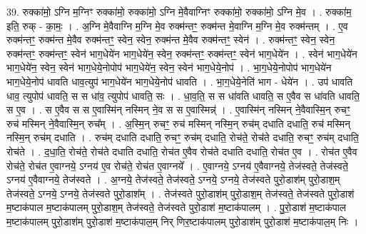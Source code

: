 \documentclass[17pt]{extarticle}
\begin{document}
39. रुक्का॑मो॒ ऽग्नि म॒ग्निꣳ रुक्का॑मो॒ रुक्का॑मो॒ ऽग्नि मे॒वैवाग्निꣳ रुक्का॑मो॒ रुक्का॑मो॒ ऽग्नि मे॒व । . रुक्का॑म॒ इति॒ रुक् - का॒मः॒ । . अ॒ग्नि मे॒वैवाग्नि म॒ग्नि मे॒व रुक्म॑न्तꣳ॒॒ रुक्म॑न्त मे॒वाग्नि म॒ग्नि मे॒व रुक्म॑न्तम् । . ए॒व रुक्म॑न्तꣳ॒॒ रुक्म॑न्त मे॒वैव रुक्म॑न्तꣳ॒॒ स्वेन॒ स्वेन॒ रुक्म॑न्त मे॒वैव रुक्म॑न्तꣳ॒॒ स्वेन॑ । . रुक्म॑न्तꣳ॒॒ स्वेन॒ स्वेन॒ रुक्म॑न्तꣳ॒॒ रुक्म॑न्तꣳ॒॒ स्वेन॑ भाग॒धेये॑न भाग॒धेये॑न॒ स्वेन॒ रुक्म॑न्तꣳ॒॒ रुक्म॑न्तꣳ॒॒ स्वेन॑ भाग॒धेये॑न । . स्वेन॑ भाग॒धेये॑न भाग॒धेये॑न॒ स्वेन॒ स्वेन॑ भाग॒धेये॒नोपोप॑ भाग॒धेये॑न॒ स्वेन॒ स्वेन॑ भाग॒धेये॒नोप॑ । . भा॒ग॒धेये॒नोपोप॑ भाग॒धेये॑न भाग॒धेये॒नोप॑ धावति धाव॒त्युप॑ भाग॒धेये॑न भाग॒धेये॒नोप॑ धावति । . भा॒ग॒धेये॒नेति॑ भाग - धेये॑न । . उप॑ धावति धाव॒ त्युपोप॑ धावति॒ स स धा॑व॒ त्युपोप॑ धावति॒ सः । . धा॒व॒ति॒ स स धा॑वति धावति॒ स ए॒वैव स धा॑वति धावति॒ स ए॒व । . स ए॒वैव स स ए॒वास्मि॑न् नस्मिन् ने॒व स स ए॒वास्मिन्न्॑ । . ए॒वास्मि॑न् नस्मिन् ने॒वैवास्मि॒न् रुचꣳ॒॒ रुच॑ मस्मिन् ने॒वैवास्मि॒न् रुच᳚म् । . अ॒स्मि॒न् रुचꣳ॒॒ रुच॑ मस्मिन् नस्मि॒न् रुच॑म् दधाति दधाति॒ रुच॑ मस्मिन् नस्मि॒न् रुच॑म् दधाति । . रुच॑म् दधाति दधाति॒ रुचꣳ॒॒ रुच॑म् दधाति॒ रोच॑ते॒ रोच॑ते दधाति॒ रुचꣳ॒॒ रुच॑म् दधाति॒ रोच॑ते । . द॒धा॒ति॒ रोच॑ते॒ रोच॑ते दधाति दधाति॒ रोच॑त ए॒वैव रोच॑ते दधाति दधाति॒ रोच॑त ए॒व । . रोच॑त ए॒वैव रोच॑ते॒ रोच॑त ए॒वाग्नये॒ ऽग्नय॑ ए॒व रोच॑ते॒ रोच॑त ए॒वाग्नये᳚ । . ए॒वाग्नये॒ ऽग्नय॑ ए॒वैवाग्नये॒ तेज॑स्वते॒ तेज॑स्वते॒ ऽग्नय॑ ए॒वैवाग्नये॒ तेज॑स्वते । . अ॒ग्नये॒ तेज॑स्वते॒ तेज॑स्वते॒ ऽग्नये॒ ऽग्नये॒ तेज॑स्वते पुरो॒डाश॑म् पुरो॒डाश॒म् तेज॑स्वते॒ ऽग्नये॒ ऽग्नये॒ तेज॑स्वते पुरो॒डाश᳚म् । . तेज॑स्वते पुरो॒डाश॑म् पुरो॒डाश॒म् तेज॑स्वते॒ तेज॑स्वते पुरो॒डाश॑ म॒ष्टाक॑पाल म॒ष्टाक॑पालम् पुरो॒डाश॒म् तेज॑स्वते॒ तेज॑स्वते पुरो॒डाश॑ म॒ष्टाक॑पालम् । . पु॒रो॒डाश॑ म॒ष्टाक॑पाल म॒ष्टाक॑पालम् पुरो॒डाश॑म् पुरो॒डाश॑ म॒ष्टाक॑पाल॒म् निर् णिर॒ष्टाक॑पालम् पुरो॒डाश॑म् पुरो॒डाश॑ म॒ष्टाक॑पाल॒म् निः । \newline
\pagebreak
{}
\end{document}
